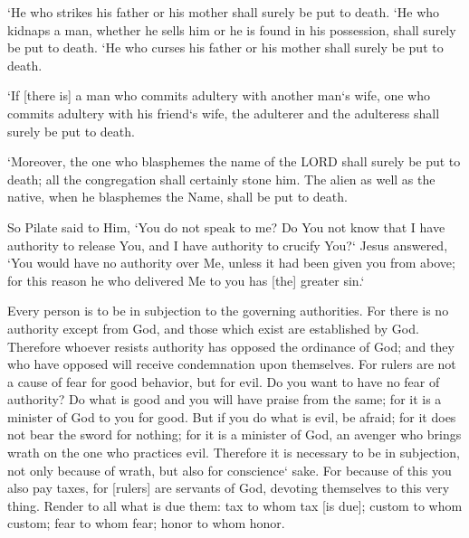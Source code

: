 \begin{scripture}[Exodus 21:15-17]
    `He who strikes his father or his mother shall surely be put to death.
    `He who kidnaps a man, whether he sells him or he is found in his possession, shall surely be put to death.
    `He who curses his father or his mother shall surely be put to death.
\end{scripture}

\begin{scripture}[Leviticus 20:10]
    `If [there is] a man who commits adultery with another man`s wife, one who commits adultery with his friend`s wife, the adulterer and the adulteress shall surely be put to death.
\end{scripture}

\begin{scripture}[Leviticus 24:16]
    `Moreover, the one who blasphemes the name of the LORD shall surely be put to death; all the congregation shall certainly stone him. The alien as well as the native, when he blasphemes the Name, shall be put to death.
\end{scripture}

\begin{scripture}[John 19:10-11]
    So Pilate said to Him, `You do not speak to me? Do You not know that I have authority to release You, and I have authority to crucify You?`
    Jesus answered, `You would have no authority over Me, unless it had been given you from above; for this reason he who delivered Me to you has [the] greater sin.`
\end{scripture}

\begin{scripture}[Romans 13:1-7]
    Every person is to be in subjection to the governing authorities. For there is no authority except from God, and those which exist are established by God.
    Therefore whoever resists authority has opposed the ordinance of God; and they who have opposed will receive condemnation upon themselves.
    For rulers are not a cause of fear for good behavior, but for evil. Do you want to have no fear of authority? Do what is good and you will have praise from the same;
    for it is a minister of God to you for good. But if you do what is evil, be afraid; for it does not bear the sword for nothing; for it is a minister of God, an avenger who brings wrath on the one who practices evil.
    Therefore it is necessary to be in subjection, not only because of wrath, but also for conscience` sake.
    For because of this you also pay taxes, for [rulers] are servants of God, devoting themselves to this very thing.
    Render to all what is due them: tax to whom tax [is due]; custom to whom custom; fear to whom fear; honor to whom honor.
\end{scripture}

